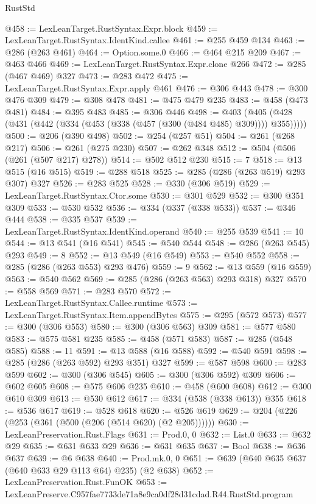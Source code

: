 \begin{lexlean}{RustStd}
\begin{coremodule}
@458 := LexLeanTarget.RustSyntax.Expr.block
@459 := LexLeanTarget.RustSyntax.IdentKind.callee
@461 := @255 @459 @134
@463 := @286 (@263 @461)
@464 := Option.some.{0}
@466 := @464 @215 @209
@467 := @463 @466
@469 := LexLeanTarget.RustSyntax.Expr.clone @266
@472 := @285 (@467 @469) @327
@473 := @283 @472
@475 := LexLeanTarget.RustSyntax.Expr.apply @461
@476 := @306 @443
@478 := @300 @476 @309
@479 := @308 @478
@481 := @475 @479 @235
@483 := @458 (@473 @481)
@484 := @395 @483
@485 := @306 @446
@498 := @403 (@405 (@428 (@431 (@442 (@334 (@453 (@338 (@457 (@300 (@484 @485) @309)))) @355)))))
@500 := @206 (@390 @498)
@502 := @254 (@257 @51)
@504 := @261 (@268 @217)
@506 := @261 (@275 @230)
@507 := @262 @348
@512 := @504 (@506 (@261 (@507 @217) @278))
@514 := @502 @512 @230
@515 := 7
@518 := @13 @515 (@16 @515)
@519 := @288 @518
@525 := @285 (@286 (@263 @519) @293 @307) @327
@526 := @283 @525
@528 := @330 (@306 @519)
@529 := LexLeanTarget.RustSyntax.Ctor.some
@530 := @301 @529
@532 := @300 @351 @309
@533 := @530 @532
@536 := @334 (@337 (@338 @533))
@537 := @346 @444
@538 := @335 @537
@539 := LexLeanTarget.RustSyntax.IdentKind.operand
@540 := @255 @539
@541 := 10
@544 := @13 @541 (@16 @541)
@545 := @540 @544
@548 := @286 (@263 @545) @293
@549 := 8
@552 := @13 @549 (@16 @549)
@553 := @540 @552
@558 := @285 (@286 (@263 @553) @293 @476)
@559 := 9
@562 := @13 @559 (@16 @559)
@563 := @540 @562
@569 := @285 (@286 (@263 @563) @293 @318) @327
@570 := @558 @569
@571 := @283 @570
@572 := LexLeanTarget.RustSyntax.Callee.runtime
@573 := LexLeanTarget.RustSyntax.Item.appendBytes
@575 := @295 (@572 @573)
@577 := @300 (@306 @553)
@580 := @300 (@306 @563) @309
@581 := @577 @580
@583 := @575 @581 @235
@585 := @458 (@571 @583)
@587 := @285 (@548 @585)
@588 := 11
@591 := @13 @588 (@16 @588)
@592 := @540 @591
@598 := @285 (@286 (@263 @592) @293 @351) @327
@599 := @587 @598
@600 := @283 @599
@602 := @300 (@306 @545)
@605 := @300 (@306 @592) @309
@606 := @602 @605
@608 := @575 @606 @235
@610 := @458 (@600 @608)
@612 := @300 @610 @309
@613 := @530 @612
@617 := @334 (@538 (@338 @613)) @355
@618 := @536 @617
@619 := @528 @618
@620 := @526 @619
@629 := @204 (@226 (@253 (@361 (@500 (@206 (@514 @620) (@2 @205))))))
@630 := LexLeanPreservation.Rust.Flags
@631 := Prod.{0, 0}
@632 := List.{0}
@633 := @632 @29
@635 := @631 @633 @29
@636 := @631 @635
@637 := Bool
@638 := @636 @637
@639 := @6 @638
@640 := Prod.mk.{0, 0}
@651 := @639 (@640 @635 @637 (@640 @633 @29 @113 @64) @235) (@2 @638)
@652 := LexLeanPreservation.Rust.FunOK
@653 := LexLeanPreserve.C957fae7733de71a8e9ca0df28d31cdad.R44.RustStd.program

\end{coremodule}
\end{lexlean}
